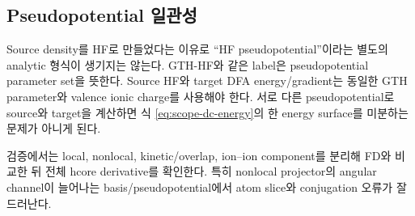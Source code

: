 \subsection{Pseudopotential 일관성}

Source density를 HF로 만들었다는 이유로 ``HF pseudopotential''이라는 별도의 analytic
형식이 생기지는 않는다. GTH-HF와 같은 label은 pseudopotential parameter set을 뜻한다.
Source HF와 target DFA energy/gradient는 동일한 GTH parameter와 valence ionic charge를
사용해야 한다. 서로 다른 pseudopotential로 source와 target을 계산하면 식
\eqref{eq:scope-dc-energy}의 한 energy surface를 미분하는 문제가 아니게 된다.

검증에서는 local, nonlocal, kinetic/overlap, ion--ion component를 분리해 FD와 비교한 뒤
전체 hcore derivative를 확인한다. 특히 nonlocal projector의 angular channel이 늘어나는
basis/pseudopotential에서 atom slice와 conjugation 오류가 잘 드러난다.
